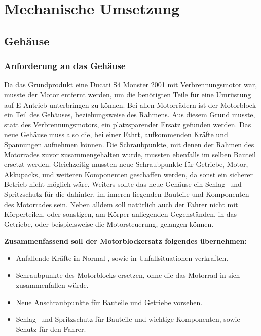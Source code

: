 \chapter{Mechanische Umsetzung}  \label{Mechanische Umsetzung}

\section{Gehäuse}
\subsection{Anforderung an das Gehäuse}

Da das Grundprodukt eine Ducati S4 Monster 2001 mit Verbrennungsmotor war, musste der Motor entfernt werden, um die benötigten Teile für eine Umrüstung auf E-Antrieb unterbringen zu können. Bei allen Motorrädern ist der Motorblock ein Teil des Gehäuses, beziehungsweise des Rahmens. Aus diesem Grund musste, statt des Verbrennungsmotors, ein platzsparender Ersatz gefunden werden. Das neue Gehäuse muss also die, bei einer Fahrt, aufkommenden Kräfte und Spannungen aufnehmen können. Die Schraubpunkte, mit denen der Rahmen des Motorrades zuvor zusammengehalten wurde, mussten ebenfalls im selben Bauteil ersetzt werden. Gleichzeitig mussten neue Schraubpunkte für Getriebe, Motor, Akkupacks, und weiteren Komponenten geschaffen werden, da sonst ein sicherer Betrieb nicht möglich wäre. Weiters sollte das neue Gehäuse ein Schlag- und Spritzschutz für die dahinter, im inneren liegenden Bauteile und Komponenten des Motorrades sein. Neben alldem soll natürlich auch der Fahrer nicht mit Körperteilen, oder sonstigen, am Körper anliegenden Gegenständen, in das Getriebe, oder beispielsweise die Motorsteuerung, gelangen können.\\\medskip

\textbf{Zusammenfassend soll der Motorblockersatz folgendes übernehmen:}\\\medskip

\begin{itemize}
	\item Anfallende Kräfte in Normal-, sowie in Unfallsituationen verkraften.
	\item Schraubpunkte des Motorblocks ersetzen, ohne die das Motorrad in sich zusammenfallen würde.
	\item Neue Anschraubpunkte für Bauteile und Getriebe vorsehen.
	\item Schlag- und Spritzschutz für Bauteile und wichtige Komponenten, sowie Schutz für den Fahrer.
\end{itemize}


